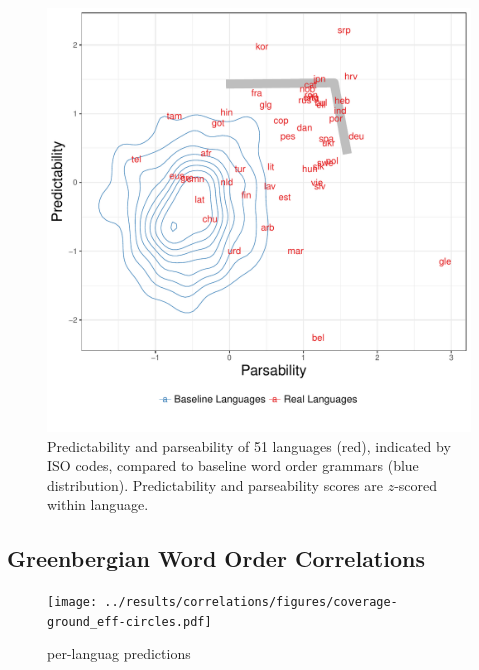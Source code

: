 \documentclass[9pt,twocolumn,twoside,lineno]{pnas-new}
\begin{document}
\begin{figure}
    \centering
    \includegraphics[scale=.45]{../results/plane/pareto-plane-iso-best-balanced-legend-viz.pdf}
    \caption{Predictability and parseability of 51 languages (red), indicated by ISO codes, compared to baseline word order grammars (blue distribution). Predictability and parseability scores are $z$-scored within language.} %
    \label{fig:pareto-plane}
\end{figure}


\subsection{Greenbergian Word Order Correlations}
\label{sec:greenberg}

\begin{figure} %
	\texttt{[image: ../results/correlations/figures/coverage-ground\_eff-circles.pdf]}
	\caption{per-languag predictions}
\end{figure}
\end{document}

